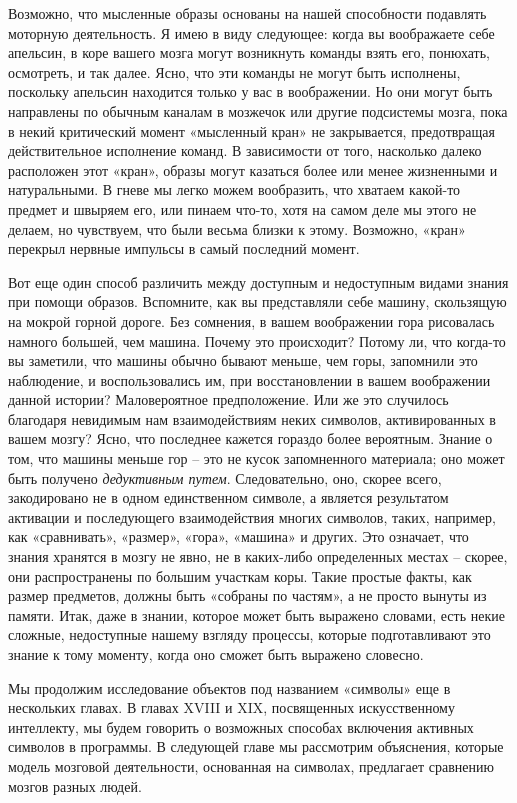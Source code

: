 \documentclass[../main.tex]{subfiles}
\begin{document}
Возможно, что мысленные образы основаны на нашей способности подавлять моторную деятельность. Я имею в виду следующее: когда вы воображаете себе апельсин, в коре вашего мозга могут возникнуть команды взять его, понюхать, осмотреть, и так далее. Ясно, что эти команды не могут быть исполнены, поскольку апельсин находится только у вас в воображении. Но они могут быть направлены по обычным каналам в мозжечок или другие подсистемы мозга, пока в некий критический момент «мысленный кран» не закрывается, предотвращая действительное исполнение команд. В зависимости от того, насколько далеко расположен этот «кран», образы могут казаться более или менее жизненными и натуральными. В гневе мы легко можем вообразить, что хватаем какой-то предмет и швыряем его, или пинаем что-то, хотя на самом деле мы этого не делаем, но чувствуем, что были весьма близки к этому. Возможно, «кран» перекрыл нервные импульсы в самый последний момент.

Вот еще один способ различить между доступным и недоступным видами знания при помощи образов. Вспомните, как вы представляли себе машину, скользящую на мокрой горной дороге. Без сомнения, в вашем воображении гора рисовалась намного большей, чем машина. Почему это происходит? Потому ли, что когда-то вы заметили, что машины обычно бывают меньше, чем горы, запомнили это наблюдение, и воспользовались им, при восстановлении в вашем воображении данной истории? Маловероятное предположение. Или же это случилось благодаря невидимым нам взаимодействиям неких символов, активированных в вашем мозгу? Ясно, что последнее кажется гораздо более вероятным. Знание о том, что машины меньше гор \--- это не кусок запомненного материала; оно может быть получено \emph{дедуктивным путем}. Следовательно, оно, скорее всего, закодировано не в одном единственном символе, а является результатом активации и последующего взаимодействия многих символов, таких, например, как «сравнивать», «размер», «гора», «машина» и других. Это означает, что знания хранятся в мозгу не явно, не в каких-либо определенных местах \--- скорее, они распространены по большим участкам коры. Такие простые факты, как размер предметов, должны быть «собраны по частям», а не просто вынуты из памяти. Итак, даже в знании, которое может быть выражено словами, есть некие сложные, недоступные нашему взгляду процессы, которые подготавливают это знание к тому моменту, когда оно сможет быть выражено словесно.

Мы продолжим исследование объектов под названием «символы» еще в нескольких главах. В главах XVIII и XIX, посвященных искусственному интеллекту, мы будем говорить о возможных способах включения активных символов в программы. В следующей главе мы рассмотрим объяснения, которые модель мозговой деятельности, основанная на символах, предлагает сравнению мозгов разных людей.
\end{document}

